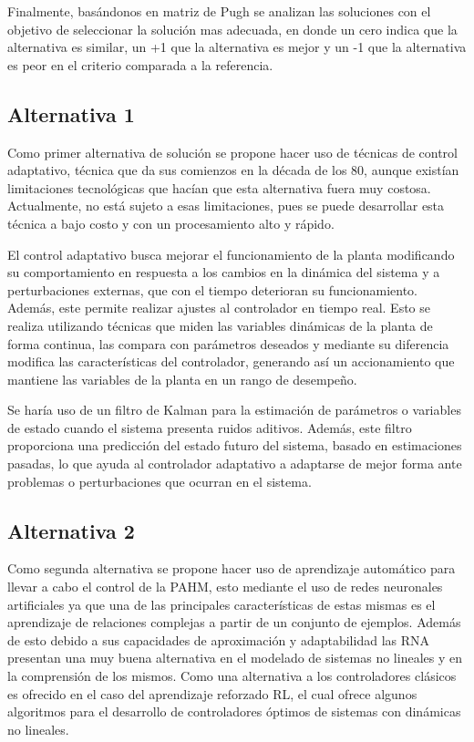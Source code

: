 \documentclass[12pt]{article}
\begin{document}
Finalmente, basándonos en matriz de Pugh se analizan las soluciones con el objetivo de seleccionar la solución mas adecuada, en donde un cero indica que la alternativa es similar, un +1 que la alternativa es mejor y un -1 que la alternativa es peor en el criterio comparada a la referencia.

\subsection{Alternativa 1}

Como primer alternativa de solución se propone hacer uso de técnicas de control adaptativo, técnica que da sus comienzos en la década de los 80, aunque existían limitaciones tecnológicas que hacían que esta alternativa fuera muy costosa. Actualmente,
no está sujeto a esas limitaciones, pues se puede desarrollar esta técnica a bajo costo y con un procesamiento alto y rápido\cite{15-tec}.

El control adaptativo busca mejorar el funcionamiento de la planta modificando su comportamiento en respuesta a los cambios en la dinámica del sistema y a perturbaciones externas, que con el tiempo deterioran su funcionamiento. Además, este permite realizar ajustes al controlador en tiempo real. Esto se realiza utilizando técnicas que miden las variables dinámicas de la planta de forma continua, las compara con parámetros deseados y mediante su diferencia modifica las características del controlador, generando así un accionamiento que mantiene las variables de la planta en un rango de desempeño\cite{15-tec}.

Se haría uso de un filtro de Kalman para la estimación de parámetros o variables de estado cuando el sistema presenta ruidos aditivos. Además, este filtro proporciona una predicción del estado futuro del sistema, basado en estimaciones pasadas, lo que ayuda al controlador adaptativo a adaptarse de mejor forma ante problemas o perturbaciones que ocurran en el sistema\cite{15-tec}.

\subsection{Alternativa 2}

Como segunda alternativa se propone hacer uso de aprendizaje automático para llevar a cabo el control de la PAHM, esto mediante el uso de redes neuronales artificiales ya que una de las principales características de estas mismas es el aprendizaje de relaciones complejas a partir de un conjunto de ejemplos. Además de esto debido a sus capacidades de aproximación y adaptabilidad las RNA presentan una muy buena alternativa en el modelado de sistemas no lineales y en la comprensión de los mismos. Como una alternativa a los controladores clásicos es ofrecido en el caso del aprendizaje reforzado RL, el cual ofrece algunos algoritmos para el desarrollo de controladores óptimos de sistemas con dinámicas no lineales\cite{15-tec}. 
\end{document}
